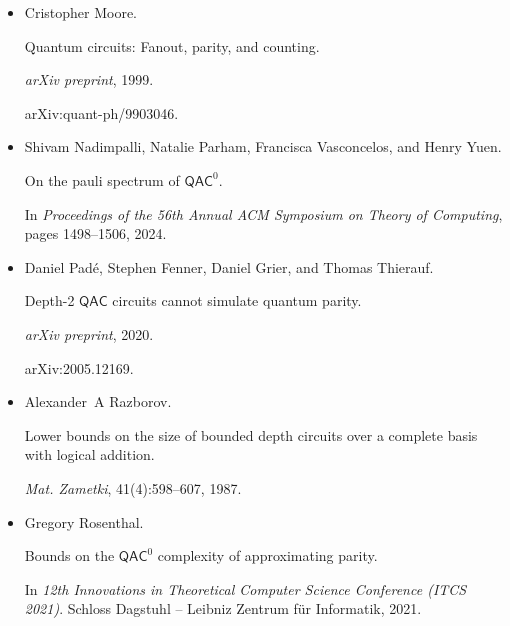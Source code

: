 \documentclass[10pt,a4paper]{article}
\begin{document}
\begin{itemize}
Multiparticle entanglement of hot trapped ions.


\emph{Physical Review Letters}, 82(9):1835, 1999.





\item[] 
[17]

Cristopher Moore.


Quantum circuits: Fanout, parity, and counting.


\emph{arXiv preprint}, 1999.


arXiv:quant-ph/9903046.





\item[] 
[18]

Shivam Nadimpalli, Natalie Parham, Francisca Vasconcelos, and Henry Yuen.


On the pauli spectrum of ${\mathsf{QAC}}^{0}$.


In \emph{Proceedings of the 56th Annual ACM Symposium on Theory of
Computing}, pages 1498–1506, 2024.





\item[] 
[19]

Daniel Padé, Stephen Fenner, Daniel Grier, and Thomas Thierauf.


Depth-2 ${\mathsf{QAC}}$ circuits cannot simulate quantum parity.


\emph{arXiv preprint}, 2020.


arXiv:2005.12169.





\item[] 
[20]

Alexander A Razborov.


Lower bounds on the size of bounded depth circuits over a complete
basis with logical addition.


\emph{Mat. Zametki}, 41(4):598–607, 1987.





\item[] 
[21]

Gregory Rosenthal.


Bounds on the ${\mathsf{QAC}}^{0}$ complexity of approximating parity.


In \emph{12th Innovations in Theoretical Computer Science Conference
(ITCS 2021)}. Schloss Dagstuhl – Leibniz Zentrum für Informatik, 2021.



\end{itemize}
\end{document}
